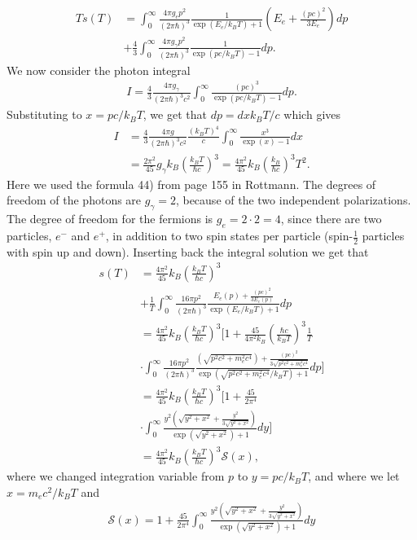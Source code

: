 \documentclass{emulateapj}
\begin{document}
	\begin{align}
		Ts(T) &= \int_{0}^{\infty}\frac{4\pi g_ep^2}{(2\pi\hbar)^3}\frac{1}{\exp(E_e/k_BT)+1}\left(E_e + \frac{(pc)^2}{3E_e}\right)dp\\
		&+ \frac{4}{3}\int_{0}^{\infty}\frac{4\pi g_\gamma p^2}{(2\pi\hbar)^3}\frac{1}{\exp(pc/k_BT)-1}dp.
	\end{align}
	We now consider the photon integral
	\begin{align}
		I = \frac{4}{3}\frac{4\pi g_\gamma}{(2\pi \hbar)^3c^2}\int_{0}^{\infty}\frac{(pc)^3}{\exp(pc/k_BT) - 1}dp.
	\end{align}
	Substituting to $x = pc/k_BT$, we get that $dp = dxk_BT/c$ which gives
	\begin{align*}
		I &= \frac{4}{3}\frac{4\pi g}{(2\pi \hbar)^3c^2}\frac{(k_BT)^4}{c}\int_{0}^{\infty}\frac{x^3}{\exp(x) - 1}dx\\
		&= \frac{2\pi^2}{45}g_\gamma k_B\left(\frac{k_BT}{\hbar c}\right)^3 = \frac{4\pi^2}{45} k_B\left(\frac{k_B}{\hbar c}\right)^3T^2.
	\end{align*}
	Here we used the formula 44) from page 155 in Rottmann. The degrees of freedom of the photons are $g_\gamma = 2$, because of the two independent polarizations. The degree of freedom for the fermions is $g_e = 2\cdot2 = 4$, since there are two particles, $e^-$ and $e^+$, in addition to two spin states per particle (spin-$\frac{1}{2}$ particles with spin up and down). Inserting back the integral solution we get that
	\begin{align}
		s(T) &= \frac{4\pi^2}{45} k_B\left(\frac{k_BT}{\hbar c}\right)^3\\
		&+ \frac{1}{T}\int_{0}^{\infty}\frac{16\pi p^2}{(2\pi\hbar)^3}\frac{E_e(p) + \frac{(pc)^2}{3E_e(p)}}{\exp(E_e/k_BT) + 1}dp\\
		& = \frac{4\pi^2}{45}k_B\left(\frac{k_BT}{\hbar c}\right)^3\Big[1 + \frac{45}{4\pi^2k_B}\left(\frac{\hbar c}{k_BT}\right)^3\frac{1}{T}\\
		&\cdot\int_{0}^{\infty}\frac{16\pi p^2}{(2\pi\hbar)^3}\frac{\left(\sqrt{p^2c^2 + m_e^2c^4}\right) + \frac{(pc)^2}{3\sqrt{p^2c^2 + m_e^2c^4}}}{\exp(\sqrt{p^2c^2 + m_e^2c^4}/k_BT)+1} dp\Big]\nonumber\\
		&= \frac{4\pi^2}{45}k_B\left(\frac{k_BT}{\hbar c}\right)^3\Big[1 +\frac{45}{2\pi^4}\\
		&\cdot\int_{0}^{\infty} \frac{y^2\left(\sqrt{y^2 + x^2}+\frac{y^2}{3\sqrt{y^2 + x^2}}\right)}{\exp(\sqrt{y^2+x^2}) + 1}dy\Big]\\
		&=\frac{4\pi^2}{45}k_B\left(\frac{k_BT}{\hbar c}\right)^3\mathcal{S}(x),
	\end{align}
	where we changed integration variable from $p$ to $y = pc/k_BT$, and where we let $x=m_ec^2/k_BT$ and 
	\begin{align}
		\mathcal{S}(x) = 1 +\frac{45}{2\pi^4}\int_{0}^{\infty} \frac{y^2\left(\sqrt{y^2 + x^2}+\frac{y^2}{3\sqrt{y^2 + x^2}}\right)}{\exp(\sqrt{y^2+x^2}) + 1}dy\nonumber
	\end{align} 
	
\end{document}

